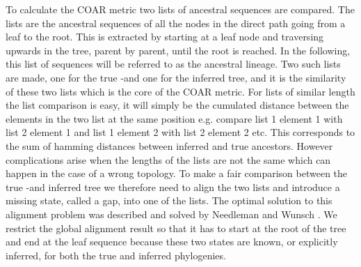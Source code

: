 To calculate the COAR metric two lists of ancestral sequences are compared.
The lists are the ancestral sequences of all the nodes in the direct path going from a leaf to the root.
This is extracted by starting at a leaf node and traversing upwards in the tree, parent by parent, until the root is reached.
In the following, this list of sequences will be referred to as the ancestral lineage.
Two such lists are made, one for the true -and one for the inferred tree, and it is the similarity of these two lists which is the core of the COAR metric.
For lists of similar length the list comparison is easy, it will simply be the cumulated distance between the elements in the two list at the same position e.g. compare list 1 element 1 with list 2 element 1 and list 1 element 2 with list 2 element 2 etc.
This corresponds to the sum of hamming distances between inferred and true ancestors.
However complications arise when the lengths of the lists are not the same which can happen in the case of a wrong topology.
To make a fair comparison between the true -and inferred tree we therefore need to align the two lists and introduce a missing state, called a gap, into one of the lists.
The optimal solution to this alignment problem was described and solved by Needleman and Wunsch \cite{needleman1970general}.
We restrict the global alignment result so that it has to start at the root of the tree and end at the leaf sequence because these two states are known, or explicitly inferred, for both the true and inferred phylogenies.
